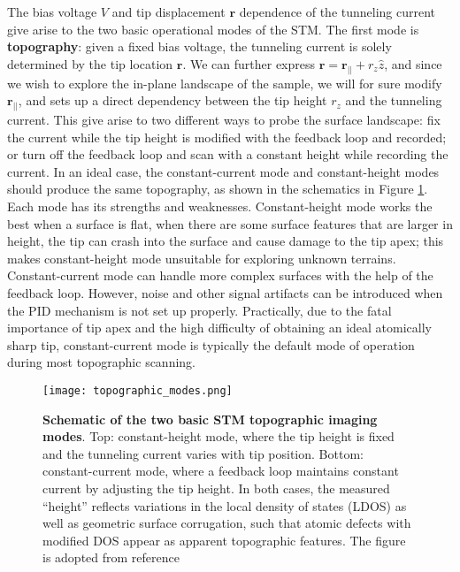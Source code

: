 \noindent The bias voltage $V$ and tip displacement $\mathbf{r}$ dependence of the tunneling current give arise to the two basic operational modes of the \ac{STM}. The first mode is \textbf{topography}: given a fixed bias voltage, the tunneling current is solely determined by the tip location $\mathbf{r}$. We can further express $\mathbf{r} = \mathbf{r_{||}} + r_z \hat{z}$, and since we wish to explore the in-plane landscape of the sample, we will for sure modify $\mathbf{r_{||}}$, and sets up a direct dependency between the tip height $r_z$ and the tunneling current. This give arise to two different ways to probe the surface landscape: fix the current while the tip height is modified with the feedback loop and recorded; or turn off the feedback loop and scan with a constant height while recording the current. In an ideal case, the constant-current mode and constant-height modes should produce the same topography, as shown in the schematics in Figure \ref{fig:topo_modes}. Each mode has its strengths and weaknesses. Constant-height mode works the best when a surface is flat, when there are some surface features that are larger in height, the tip can crash into the surface and cause damage to the tip apex; this makes constant-height mode unsuitable for exploring unknown terrains. Constant-current mode can handle more complex surfaces with the help of the feedback loop. However, noise and other signal artifacts can be introduced when the PID mechanism is not set up properly. Practically, due to the fatal importance of tip apex and the high difficulty of obtaining an ideal atomically sharp tip, constant-current mode is typically the default mode of operation during most topographic scanning. 

\begin{figure}
	\centering
	\texttt{[image: topographic\_modes.png]}
	\caption[\textbf{Schematic of the two basic STM topographic imaging modes}]{\textbf{Schematic of the two basic STM topographic imaging modes}. Top: constant-height mode, where the tip height is fixed and the tunneling current varies with tip position. Bottom: constant-current mode, where a feedback loop maintains constant current by adjusting the tip height. In both cases, the measured “height” reflects variations in the local density of states (LDOS) as well as geometric surface corrugation, such that atomic defects with modified DOS appear as apparent topographic features. The figure is adopted from reference \cite{stuartScanningTunnellingMicroscopy2021}}
	\label{fig:topo_modes}
\end{figure}

